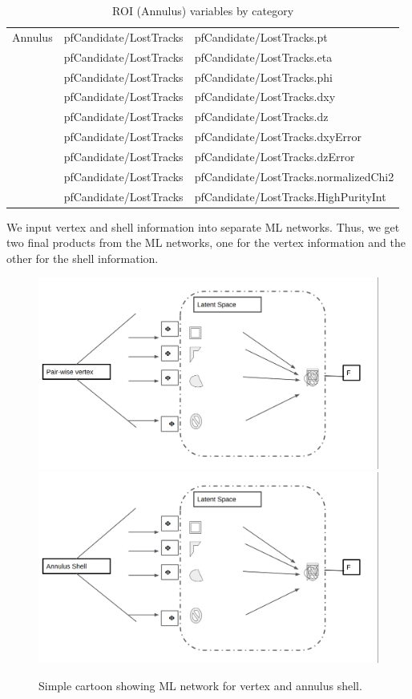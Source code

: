 \begin{table}[htb]
\caption{ROI (Annulus) variables by category}
\begin{center}
\begin{tabular}{r|l|l}\hline
 Annulus      & pfCandidate/LostTracks & pfCandidate/LostTracks.pt \\
              & pfCandidate/LostTracks & pfCandidate/LostTracks.eta \\
              & pfCandidate/LostTracks & pfCandidate/LostTracks.phi \\
              & pfCandidate/LostTracks & pfCandidate/LostTracks.dxy \\
              & pfCandidate/LostTracks & pfCandidate/LostTracks.dz \\
              & pfCandidate/LostTracks & pfCandidate/LostTracks.dxyError \\
              & pfCandidate/LostTracks & pfCandidate/LostTracks.dzError \\
              & pfCandidate/LostTracks & pfCandidate/LostTracks.normalizedChi2 \\
              & pfCandidate/LostTracks & pfCandidate/LostTracks.HighPurityInt \\
 \hline
 \hline
\end{tabular}
\label{tab:ROIANvars}
\end{center}
\end{table}

We input vertex and shell information into separate ML networks. Thus, we get two final products from the ML networks, one for the vertex information and the other for the shell information.

 \begin{figure}[h!]
   \label{fig:NetworkML}
   \centering
   \includegraphics[width=0.6\linewidth]{figs/PhiVNet.png}
   \includegraphics[width=0.6\linewidth]{figs/PhiANet.png}
   \caption{Simple cartoon showing ML network for vertex and annulus shell.}
 \end{figure}

